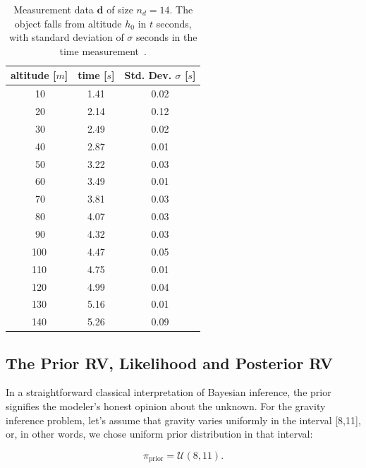 \begin{table}[htp]%
\caption{Measurement data $\mathbf{d}$ of size $n_d=14$.
The object falls from altitude $h_0$ in $t$ seconds, with standard deviation of $\sigma$ seconds in the time measurement~\cite{interactagram}.
}
\vspace{-8pt}
\begin{center}
\begin{tabular}{ccc}
\toprule
altitude [$m$] & time [$s$]  & Std. Dev. $\sigma$ [$s$]\\
\midrule
\midrule
$~$10	&	1.41	&	0.02	\\
$~$20	&	2.14	&	0.12	\\
$~$30	&	2.49	&	0.02	\\
$~$40	&	2.87	&	0.01	\\
$~$50	&	3.22	&	0.03	\\
$~$60	&	3.49	&	0.01	\\
$~$70	&	3.81	&	0.03	\\
$~$80	&	4.07	&	0.03	\\
$~$90	&	4.32	&	0.03	\\
100	&	4.47	&	0.05	\\
110	&	4.75	&	0.01	\\
120	&	4.99	&	0.04	\\
130	&	5.16	&	0.01	\\
140	&	5.26	&	0.09	\\
\bottomrule
\end{tabular}
\end{center}
\label{table:data}
\end{table}



\subsection{The Prior RV, Likelihood and Posterior RV}

In a straightforward classical interpretation of Bayesian inference, the prior signifies the modeler's honest opinion about the unknown.
For the gravity inference problem, let's assume that gravity varies uniformly in the interval [8,11], or, in other words, we chose uniform prior distribution in that interval:

\begin{equation}\label{eq-g-prior}
\pi_{\text{prior}}=\mathcal{U}(8,11).
\end{equation}


